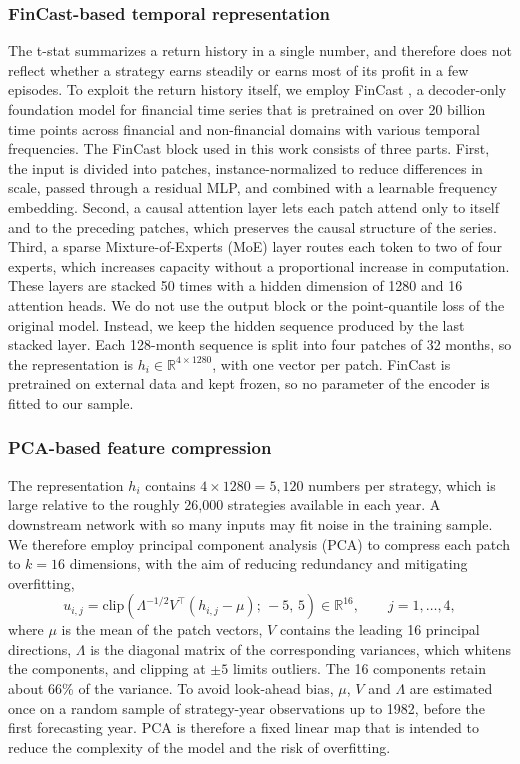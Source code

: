 \documentclass[pdflatex,sn-mathphys-num]{sn-jnl}%
\theoremstyle{thmstyleone}%
\theoremstyle{thmstyletwo}%
\theoremstyle{thmstylethree}%
\begin{document}
\subsubsection{FinCast-based temporal representation}\label{subsubModel2}
The t-stat summarizes a return history in a single number, and therefore does not reflect whether a strategy earns steadily or earns most of its profit in a few episodes. To exploit the return history itself, we employ FinCast \cite{zhu2025fincast}, a decoder-only foundation model for financial time series that is pretrained on over 20 billion time points across financial and non-financial domains with various temporal frequencies. The FinCast block used in this work consists of three parts. First, the input is divided into patches, instance-normalized to reduce differences in scale, passed through a residual MLP, and combined with a learnable frequency embedding. Second, a causal attention layer lets each patch attend only to itself and to the preceding patches, which preserves the causal structure of the series. Third, a sparse Mixture-of-Experts (MoE) layer routes each token to two of four experts, which increases capacity without a proportional increase in computation. These layers are stacked 50 times with a hidden dimension of 1280 and 16 attention heads. We do not use the output block or the point-quantile loss of the original model. Instead, we keep the hidden sequence produced by the last stacked layer. Each 128-month sequence is split into four patches of 32 months, so the representation is $h_i \in \mathbb{R}^{4 \times 1280}$, with one vector per patch. FinCast is pretrained on external data and kept frozen, so no parameter of the encoder is fitted to our sample.

\subsubsection{PCA-based feature compression}\label{subsubModel3}
The representation $h_i$ contains $4 \times 1280 = 5{,}120$ numbers per strategy, which is large relative to the roughly 26,000 strategies available in each year. A downstream network with so many inputs may fit noise in the training sample. We therefore employ principal component analysis (PCA) \cite{hotelling1933analysis} to compress each patch to $k = 16$ dimensions, with the aim of reducing redundancy and mitigating overfitting,
\begin{equation}
u_{i,j} = \mathrm{clip}\!\left(\Lambda^{-1/2} V^{\top}\!\left(h_{i,j} - \mu\right);\, -5,\, 5\right) \in \mathbb{R}^{16}, \qquad j = 1, \ldots, 4,
\label{eq:pca}
\end{equation}
where $\mu$ is the mean of the patch vectors, $V$ contains the leading 16 principal directions, $\Lambda$ is the diagonal matrix of the corresponding variances, which whitens the components, and clipping at $\pm 5$ limits outliers. The 16 components retain about 66\% of the variance. To avoid look-ahead bias, $\mu$, $V$ and $\Lambda$ are estimated once on a random sample of strategy-year observations up to 1982, before the first forecasting year. PCA is therefore a fixed linear map that is intended to reduce the complexity of the model and the risk of overfitting.
\end{document}
